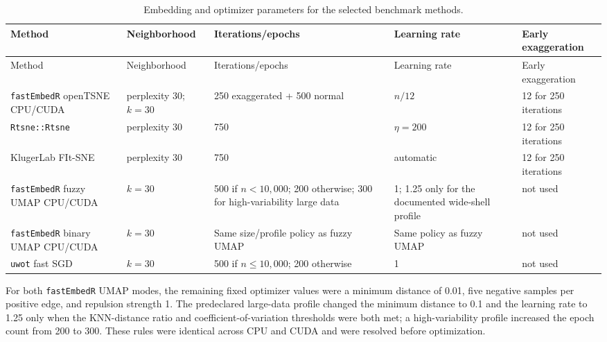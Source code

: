 \documentclass[twoside,11pt]{article}
\newcommand{\pkg}{\texttt{fastEmbedR}}
\begin{document}
\begingroup
\footnotesize
\setlength{\tabcolsep}{2.5pt}
\begin{longtable}{p{}p{}p{}p{}p{}}
\caption{Embedding and optimizer parameters for the selected benchmark methods.}\label{tab:optimizer-parameters}\\
\toprule
Method & Neighborhood & Iterations/epochs & Learning rate & Early exaggeration\\
\midrule
\endfirsthead
\toprule
Method & Neighborhood & Iterations/epochs & Learning rate & Early exaggeration\\
\midrule
\endhead
\pkg{} openTSNE CPU/CUDA & perplexity 30; $k=30$ & 250 exaggerated + 500 normal & $n/12$ & 12 for 250 iterations\\
\texttt{Rtsne::Rtsne} & perplexity 30 & 750 & $\eta=200$ & 12 for 250 iterations\\
KlugerLab FIt-SNE & perplexity 30 & 750 & automatic & 12 for 250 iterations\\
\pkg{} fuzzy UMAP CPU/CUDA & $k=30$ & 500 if $n<10{,}000$; 200 otherwise; 300 for high-variability large data & 1; 1.25 only for the documented wide-shell profile & not used\\
\pkg{} binary UMAP CPU/CUDA & $k=30$ & Same size/profile policy as fuzzy UMAP & Same policy as fuzzy UMAP & not used\\
\texttt{uwot} fast SGD & $k=30$ & 500 if $n\leq10{,}000$; 200 otherwise & 1 & not used\\
\bottomrule
\end{longtable}
\endgroup

For both \pkg{} UMAP modes, the remaining fixed optimizer values were a
minimum distance of 0.01, five negative samples per positive edge, and
repulsion strength 1. The predeclared large-data profile changed the
minimum distance to 0.1 and the learning rate to 1.25 only when the KNN-distance
ratio and coefficient-of-variation thresholds were both met; a
high-variability profile increased the epoch count from 200 to 300. These
rules were identical across CPU and CUDA and were resolved before
optimization.
\end{document}
